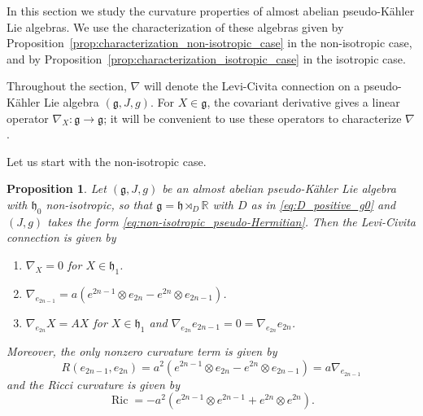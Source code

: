 \documentclass{article}
\newtheorem{proposition}[theorem]{Proposition}
\theoremstyle{definition}
\DeclareMathOperator{\Ric}{Ric}
\newcommand{\R}{\mathbb{R}}
\newcommand{\frg}{\mathfrak{g}}
\newcommand{\frh}{\mathfrak{h}}
\newcommand{\lie}[1]{\mathfrak{#1}}
\newcommand{\g}{\lie g}
\newcommand{\h}{\lie h}
\begin{document}
In this section we study the curvature properties of almost abelian pseudo-Kähler Lie algebras. We use the characterization of these algebras given by Proposition~\ref{prop:characterization_non-isotropic_case} in the non-isotropic case, and by Proposition~\ref{prop:characterization_isotropic_case} in the isotropic case.\medskip

Throughout the section, $\nabla$ will denote the Levi-Civita connection on a pseudo-Kähler Lie algebra $(\frg,J,g)$. For $X\in\g$, the covariant derivative gives a linear operator $\nabla_X\colon\g\to\g$; it will be convenient to use these operators to characterize $\nabla$.\medskip

Let us start with the non-isotropic case.

\begin{proposition}\label{prop:curvature_definite_g0}
    Let $(\frg,J,g)$ be an almost abelian pseudo-Kähler Lie algebra with $\frh_0$ non-isotropic, so that $\g=\h\rtimes_D\R$ with $D$ as in \eqref{eq:D_positive_g0} and $(J,g)$ takes the form \eqref{eq:non-isotropic_pseudo-Hermitian}. Then the Levi-Civita connection is given by \begin{enumerate}
        \item $\nabla_X=0$ for $X\in\frh_1$.
        \item $\nabla_{e_{2n-1}}=a(e^{2n-1}\otimes e_{2n}-e^{2n}\otimes e_{2n-1})$.
        \item $\nabla_{e_{2n}}X=AX$ for $X\in\frh_1$ and $\nabla_{e_{2n}}e_{2n-1}=0=\nabla_{e_{2n}}e_{2n}$.
    \end{enumerate}

    Moreover, the only nonzero curvature term is given by $$R(e_{2n-1},e_{2n})=a^2(e^{2n-1}\otimes e_{2n}-e^{2n}\otimes e_{2n-1})=a\nabla_{e_{2n-1}}$$ and the Ricci curvature is given by $$\Ric=-a^2(e^{2n-1}\otimes e^{2n-1}+e^{2n}\otimes e^{2n}).$$
\end{proposition}
\end{document}
